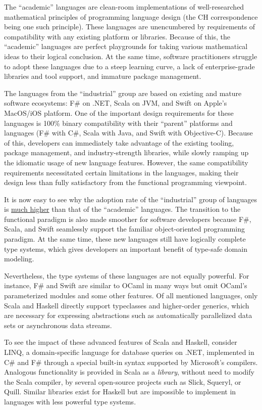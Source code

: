 The ``academic'' languages are clean-room implementations of well-researched
mathematical principles of programming language design (the CH correspondence
being one such principle). These languages are unencumbered by requirements
of compatibility with any existing platform or libraries. Because
of this, the ``academic'' languages are perfect playgrounds for
taking various mathematical ideas to their logical conclusion. At
the same time, software practitioners struggle to adopt these languages
due to a steep learning curve, a lack of enterprise-grade libraries
and tool support, and immature package management.

The languages from the ``industrial'' group are based on existing
and mature software ecosystems: F\# on .NET, Scala on JVM, and Swift
on Apple's MacOS/iOS platform. One of the important design requirements
for these languages is 100\% binary compatibility with their ``parent''
platforms and languages (F\# with C\#, Scala with Java, and Swift
with Objective-C). Because of this, developers can immediately take
advantage of the existing tooling, package management, and industry-strength
libraries, while slowly ramping up the idiomatic usage of new language
features. However, the same compatibility requirements necessitated
certain limitations in the languages, making their design less than
fully satisfactory from the functional programming viewpoint.

It is now easy to see why the adoption rate of the ``industrial''
group of languages is \href{https://www.tiobe.com/tiobe-index/}{much higher}
than that of the ``academic'' languages. The transition to the functional
paradigm is also made smoother for software developers because F\#,
Scala, and Swift seamlessly support the familiar object-oriented programming
paradigm. At the same time, these new languages still have logically
complete type systems, which gives developers an important benefit
of type-safe domain modeling.

Nevertheless, the type systems of these languages are not equally
powerful. For instance, F\# and Swift are similar to OCaml in many
ways but omit OCaml's parameterized modules and some other features.
Of all mentioned languages, only Scala and Haskell directly support
typeclasses and higher-order generics, which are necessary for expressing
abstractions such as automatically parallelized data sets or asynchronous
data streams.

To see the impact of these advanced features of Scala and Haskell,
consider LINQ, a domain-specific language for database queries on
.NET, implemented in C\# and F\# through a special built-in syntax
supported by Microsoft's compilers. Analogous functionality is provided
in Scala as a \emph{library}, without need to modify the Scala compiler,
by several open-source projects such as Slick, Squeryl, or Quill.
Similar libraries exist for Haskell \textendash{} but are impossible
to implement in languages with less powerful type systems.

